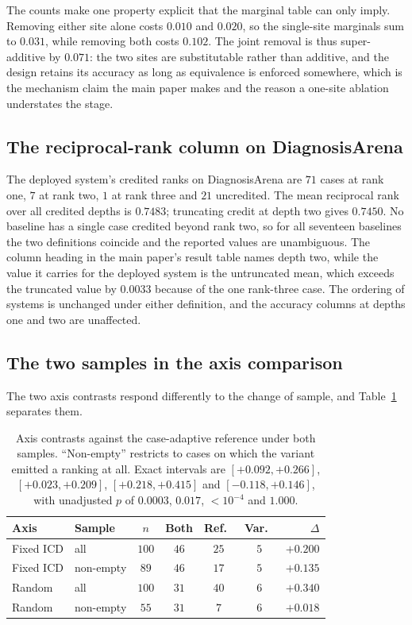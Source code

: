\documentclass[letterpaper]{article}
\begin{document}
The counts make one property explicit that the marginal table can only imply.
Removing either site alone costs $0.010$ and $0.020$, so the single-site marginals sum to $0.031$, while removing both costs $0.102$.
The joint removal is thus super-additive by $0.071$: the two sites are substitutable rather than additive, and the design retains its accuracy as long as equivalence is enforced somewhere, which is the mechanism claim the main paper makes and the reason a one-site ablation understates the stage.

\subsection{The reciprocal-rank column on DiagnosisArena}

The deployed system's credited ranks on DiagnosisArena are $71$ cases at rank one, $7$ at rank two, $1$ at rank three and $21$ uncredited.
The mean reciprocal rank over all credited depths is $0.7483$; truncating credit at depth two gives $0.7450$.
No baseline has a single case credited beyond rank two, so for all seventeen baselines the two definitions coincide and the reported values are unambiguous.
The column heading in the main paper's result table names depth two, while the value it carries for the deployed system is the untruncated mean, which exceeds the truncated value by $0.0033$ because of the one rank-three case.
The ordering of systems is unchanged under either definition, and the accuracy columns at depths one and two are unaffected.

\subsection{The two samples in the axis comparison}

The two axis contrasts respond differently to the change of sample, and Table~\ref{tab:rec-axis} separates them.

\begin{table}[tb]
\centering
\footnotesize
\setlength{\tabcolsep}{2.5pt}
\begin{tabular}{@{}llccccr@{}}
\toprule
Axis & Sample & $n$ & Both & Ref.\ & Var.\ & $\Delta$ \\
\midrule
Fixed ICD & all      & $100$ & $46$ & $25$ & $5$ & $+0.200$ \\
Fixed ICD & non-empty & $89$ & $46$ & $17$ & $5$ & $+0.135$ \\
Random    & all      & $100$ & $31$ & $40$ & $6$ & $+0.340$ \\
Random    & non-empty & $55$ & $31$ & $7$  & $6$ & $+0.018$ \\
\bottomrule
\end{tabular}
\caption{Axis contrasts against the case-adaptive reference under both samples. ``Non-empty'' restricts to cases on which the variant emitted a ranking at all. Exact intervals are $[+0.092,+0.266]$, $[+0.023,+0.209]$, $[+0.218,+0.415]$ and $[-0.118,+0.146]$, with unadjusted $p$ of $0.0003$, $0.017$, ${<}10^{-4}$ and $1.000$.}
\label{tab:rec-axis}
\end{table}
\end{document}
